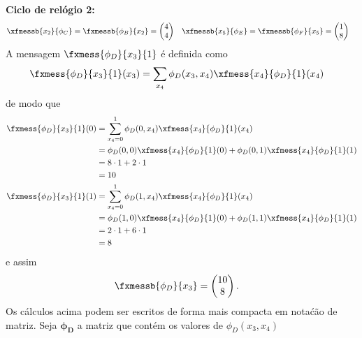 \begin{exenumerate}
\begin{solution}
        { \bf Ciclo de rel\'ogio 2:}\\
        \begin{align}
            \xfmessb{x_2}{\phi_C} = \fxmessb{\phi_B}{x_2}  & = \begin{pmatrix}
                4 \\
                4 \\
            \end{pmatrix}
            &
            \xfmessb{x_5}{\phi_E} =  \fxmessb{\phi_F}{x_5} & = \begin{pmatrix}
                1 \\
                8 \\
            \end{pmatrix}
        \end{align}
        A mensagem $\fxmess{\phi_D}{x_3}{1}$ \'e definida como
        \begin{align}
            \fxmess{\phi_D}{x_3}{1}(x_3) & = \sum_{x_4} \phi_D(x_3,x_4) \xfmess{x_4}{\phi_D}{1}(x_4)\end{align}
        de modo que
        \begin{align}
            \fxmess{\phi_D}{x_3}{1}(0) & = \sum_{x_4=0}^1 \phi_D(0,x_4) \xfmess{x_4}{\phi_D}{1}(x_4) \\
            & = \phi_D(0,0) \xfmess{x_4}{\phi_D}{1}(0) + \phi_D(0,1) \xfmess{x_4}{\phi_D}{1}(1) \\
            & = 8 \cdot 1  + 2 \cdot 1\\
            & = 10\\
            \fxmess{\phi_D}{x_3}{1}(1) & = \sum_{x_4=0}^1 \phi_D(1,x_4) \xfmess{x_4}{\phi_D}{1}(x_4) \\
            & = \phi_D(1,0) \xfmess{x_4}{\phi_D}{1}(0) + \phi_D(1,1) \xfmess{x_4}{\phi_D}{1}(1) \\
            & = 2 \cdot 1 + 6 \cdot 1\\
            & = 8
        \end{align}
        e assim
        \begin{align}
            \fxmessb{\phi_D}{x_3} &=  \begin{pmatrix}
                10 \\
                8
            \end{pmatrix}.
        \end{align}
        Os c\'alculos acima podem ser escritos de forma mais compacta em nota\'c\~ao de matriz. Seja $\pmb{\phi_D}$ a matriz que cont\'em os valores de $\phi_D(x_3, x_4)$ 

\end{solution}
\end{exenumerate}
